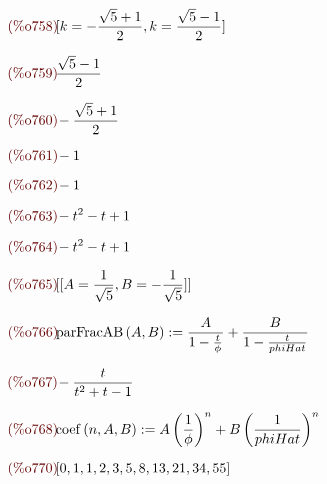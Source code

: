 \begin{math}\displaystyle
\parbox{8ex}{\color{labelcolor}(\%o758) }
[k=-\frac{\sqrt{5}+1}{2},k=\frac{\sqrt{5}-1}{2}]
\end{math}

\begin{math}\displaystyle
\parbox{8ex}{\color{labelcolor}(\%o759) }
\frac{\sqrt{5}-1}{2}
\end{math}

\begin{math}\displaystyle
\parbox{8ex}{\color{labelcolor}(\%o760) }
-\frac{\sqrt{5}+1}{2}
\end{math}

\begin{math}\displaystyle
\parbox{8ex}{\color{labelcolor}(\%o761) }
-1
\end{math}

\begin{math}\displaystyle
\parbox{8ex}{\color{labelcolor}(\%o762) }
-1
\end{math}

\begin{math}\displaystyle
\parbox{8ex}{\color{labelcolor}(\%o763) }
-{t}^{2}-t+1
\end{math}

\begin{math}\displaystyle
\parbox{8ex}{\color{labelcolor}(\%o764) }
-{t}^{2}-t+1
\end{math}

\begin{math}\displaystyle
\parbox{8ex}{\color{labelcolor}(\%o765) }
[[A=\frac{1}{\sqrt{5}},B=-\frac{1}{\sqrt{5}}]]
\end{math}

\begin{math}\displaystyle
\parbox{8ex}{\color{labelcolor}(\%o766) }
\mathrm{parFracAB}\left( A,B\right)
:=\frac{A}{1-\frac{t}{\phi}}+\frac{B}{1-\frac{t}{phiHat}}
\end{math}

\begin{math}\displaystyle
\parbox{8ex}{\color{labelcolor}(\%o767) }
-\frac{t}{{t}^{2}+t-1}
\end{math}

\begin{math}\displaystyle
\parbox{8ex}{\color{labelcolor}(\%o768) }
\mathrm{coef}\left( n,A,B\right) :=A\,{\left( \frac{1}{\phi}\right)
}^{n}+B\,{\left( \frac{1}{phiHat}\right) }^{n}
\end{math}

\begin{math}\displaystyle
\parbox{8ex}{\color{labelcolor}(\%o770) }
[0,1,1,2,3,5,8,13,21,34,55]
\end{math}


